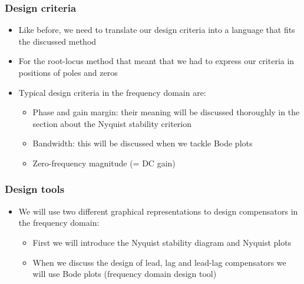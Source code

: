\begin{frame}
\frametitle{Design criteria}
\begin{itemize}
\item Like before, we need to translate our design criteria into a language that fits the discussed method
\vspace{1cm}
\item For the root-locus method that meant that we had to express our criteria in positions of poles and zeros
\vspace{1cm}
\item Typical design criteria in the frequency domain are: \begin{itemize}
\vspace{0.25cm}
\item Phase and gain margin: their meaning will be discussed thoroughly in the section about the Nyquist stability criterion
\vspace{0.5cm}
\item Bandwidth: this will be discussed when we tackle Bode plots
\vspace{0.5cm}
\item Zero-frequency magnitude (= DC gain)
\end{itemize}
\end{itemize}
\end{frame}

\begin{frame}
\frametitle{Design tools}
\begin{itemize}
\vspace{-1cm}
\item We will use two different graphical representations to design compensators in the frequency domain:
\\ \begin{itemize}
\vspace{0.75cm}
\item First we will introduce the Nyquist stability diagram and Nyquist plots
\vspace{0.75cm}
\item When we discuss the design of lead, lag and lead-lag compensators we will use Bode plots (frequency domain design tool)
\end{itemize}
\end{itemize}
\end{frame}

